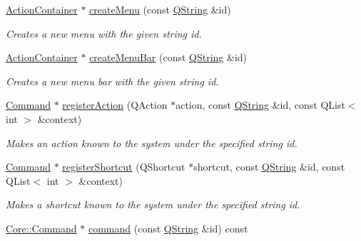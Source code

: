 \begin{DoxyCompactItemize}
\item 
\hyperlink{class_core_1_1_action_container}{\-Action\-Container} $\ast$ \hyperlink{group___core_plugin_ga1a2a9935fbe66257754f6cf21e596c01}{create\-Menu} (const \hyperlink{group___u_a_v_objects_plugin_gab9d252f49c333c94a72f97ce3105a32d}{\-Q\-String} \&id)
\begin{DoxyCompactList}\small\item\em \-Creates a new menu with the given string {\itshape id\/}. \end{DoxyCompactList}\item 
\hyperlink{class_core_1_1_action_container}{\-Action\-Container} $\ast$ \hyperlink{group___core_plugin_gaef1eb51454ecf1c2d3989db8b3a4e127}{create\-Menu\-Bar} (const \hyperlink{group___u_a_v_objects_plugin_gab9d252f49c333c94a72f97ce3105a32d}{\-Q\-String} \&id)
\begin{DoxyCompactList}\small\item\em \-Creates a new menu bar with the given string {\itshape id\/}. \end{DoxyCompactList}\item 
\hyperlink{class_core_1_1_command}{\-Command} $\ast$ \hyperlink{group___core_plugin_ga85856b30617fb3861bb25b1745e88ab1}{register\-Action} (\-Q\-Action $\ast$action, const \hyperlink{group___u_a_v_objects_plugin_gab9d252f49c333c94a72f97ce3105a32d}{\-Q\-String} \&id, const \-Q\-List$<$ int $>$ \&context)
\begin{DoxyCompactList}\small\item\em \-Makes an {\itshape action\/} known to the system under the specified string {\itshape id\/}. \end{DoxyCompactList}\item 
\hyperlink{class_core_1_1_command}{\-Command} $\ast$ \hyperlink{group___core_plugin_ga887455dd80ccba90125634d83982950d}{register\-Shortcut} (\-Q\-Shortcut $\ast$shortcut, const \hyperlink{group___u_a_v_objects_plugin_gab9d252f49c333c94a72f97ce3105a32d}{\-Q\-String} \&id, const \-Q\-List$<$ int $>$ \&context)
\begin{DoxyCompactList}\small\item\em \-Makes a {\itshape shortcut\/} known to the system under the specified string {\itshape id\/}. \end{DoxyCompactList}\item 
\hyperlink{class_core_1_1_command}{\-Core\-::\-Command} $\ast$ \hyperlink{group___core_plugin_gacd785934e8130fefdd7b0c396d6f5ede}{command} (const \hyperlink{group___u_a_v_objects_plugin_gab9d252f49c333c94a72f97ce3105a32d}{\-Q\-String} \&id) const 

\end{DoxyCompactItemize}
